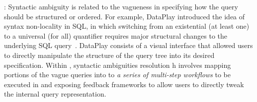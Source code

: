: 
Syntactic ambiguity is related to the 
vagueness in specifying how the 
query should be structured or ordered. 
For example, DataPlay introduced 
the idea of syntax non-locality in SQL, 
in which switching from an existential 
(at least one) to a universal (for all) 
quantifier requires major structural changes 
to the underlying SQL query~\cite{Abouzied2012}. 
DataPlay consists of a visual interface 
that allowed users to directly manipulate 
the structure of the query tree into 
its desired specification. 
Within \vida, syntactic ambiguities resolution  h
involves mapping portions of the vague queries 
into to \textit{a series of multi-step workflows} 
to be executed in \vidaql and exposing feedback 
frameworks to allow users to directly tweak 
the internal query representation. 

